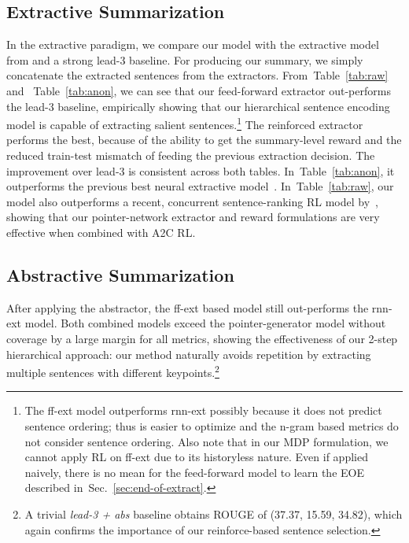 \documentclass[11pt,a4paper]{article}
\def\secref#1{Sec.~\ref{#1}}
\def\tabref#1{Table~\ref{#1}}
\begin{document}
\subsection{Extractive Summarization}
In the extractive paradigm, 
we compare our model with 
the extractive model from \citet{AAAI17:summarunner} and a strong lead-3 baseline.
For producing our summary, we simply concatenate the extracted sentences from the extractors.
From~\tabref{tab:raw} and ~\tabref{tab:anon},
we can see that our feed-forward extractor out-performs the lead-3 baseline, 
empirically showing that our hierarchical sentence encoding model is capable of extracting salient sentences.\footnote{The ff-ext model outperforms rnn-ext possibly because it does not predict sentence ordering; thus is easier to optimize and the n-gram based metrics do not consider sentence ordering. Also note that in our MDP formulation, we cannot apply RL on ff-ext due to its historyless nature.
Even if applied naively, there is no mean for the feed-forward model to learn the EOE described in~\secref{sec:end-of-extract}.}
The reinforced extractor performs the best, because of the ability to get the summary-level reward and the reduced train-test mismatch of feeding the previous extraction decision.
The improvement over lead-3 is consistent across both tables.
In~\tabref{tab:anon}, it outperforms the previous best neural extractive model~\cite{AAAI17:summarunner}.
In~\tabref{tab:raw}, our model also outperforms a recent, concurrent sentence-ranking RL model by~\citet{extract_rl}, showing that our pointer-network extractor and reward formulations are very effective when combined with A2C RL.



\subsection{Abstractive Summarization}
After applying the abstractor, the ff-ext based model still out-performs the rnn-ext model.
Both combined models exceed the pointer-generator model \citep{get_to_the_point} without coverage by a large margin for all metrics, 
showing the effectiveness of our 2-step hierarchical approach:
our method naturally avoids repetition by extracting multiple sentences with different keypoints.\footnote{A trivial \textit{lead-3 + abs} baseline obtains ROUGE of (37.37, 15.59, 34.82), which again confirms the importance of our reinforce-based sentence selection.}
\end{document}
